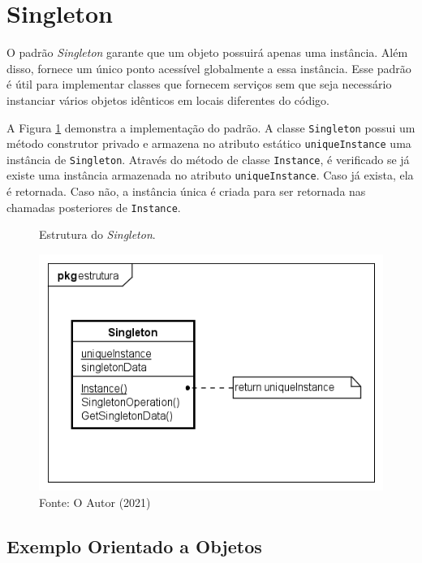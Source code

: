 \section{Singleton}

O padrão \textit{Singleton} garante que um objeto possuirá apenas uma 
instância. Além disso, fornece um único ponto acessível 
globalmente a essa instância. Esse padrão é útil 
para implementar classes que fornecem serviços sem que seja 
necessário instanciar vários objetos idênticos em 
locais diferentes do código.\cite{gamma:1995}

A Figura \ref{singleton_struct} demonstra a implementação 
do padrão. A classe \texttt{Singleton} possui um método construtor 
privado e armazena no atributo estático \texttt{uniqueInstance} uma 
instância de \texttt{Singleton}. Através do método de classe 
\texttt{Instance}, é verificado se já existe uma instância 
armazenada no atributo \texttt{uniqueInstance}. Caso já exista, 
ela é retornada. Caso não, a instância única é criada 
para ser retornada nas chamadas posteriores de \texttt{Instance}.

\begin{figure}[htb]
	\caption{\label{singleton_struct}Estrutura do \textit{Singleton}.}
	\begin{center}
	    \includegraphics[scale=0.6]{5_padroes-contexto-funcional/5.1_criacionais/5.1.5_singleton/singleton_estrutura.png}
	\end{center}
  \caption*{Fonte: O Autor (2021)}
\end{figure}

\subsection*{Exemplo Orientado a Objetos}

